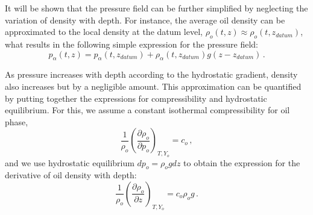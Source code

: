 \documentclass[authoryear,preprint,review,11pt]{elsarticle}
\begin{document}

It will be shown that the pressure field can be further simplified by neglecting the variation of density with depth. For instance, the average oil density can be approximated to the local density at the datum level, $\rho_o (t,z) \approx \rho_o (t, z_{datum})$, what results in the following simple expression for the pressure field:
\begin{equation}
p_\alpha (t,z) = p_\alpha \left(t, z_{datum}\right)+ \rho_\alpha (t, z_{datum}) g \left(z-z_{datum}\right) \, .
\end{equation}



%
%
%
%
%
%
%
%
%

 As pressure increases with depth according to the hydrostatic gradient, density also increases but by a negligible amount. This approximation can be quantified by putting together the expressions for compressibility and hydrostatic equilibrium. For this, we assume a constant isothermal compressibility for oil phase,
\begin{equation}\label{eq: grado}
\frac{1}{\rho_o}\left(\frac{\partial \rho_o}{\partial p_o} \right)_{T,Y_o} = c_o \, ,
\end{equation}
 and we use hydrostatic equilibrium $dp_o = \rho_o g dz$ to obtain the expression for the derivative of oil density with depth:
\begin{equation}\label{eq: gradodz}
 \frac{1}{\rho_o}\left(\frac{\partial \rho_o}{\partial z} \right)_{T,Y_o} = c_o \rho_o g \, .
\end{equation}
\end{document}
